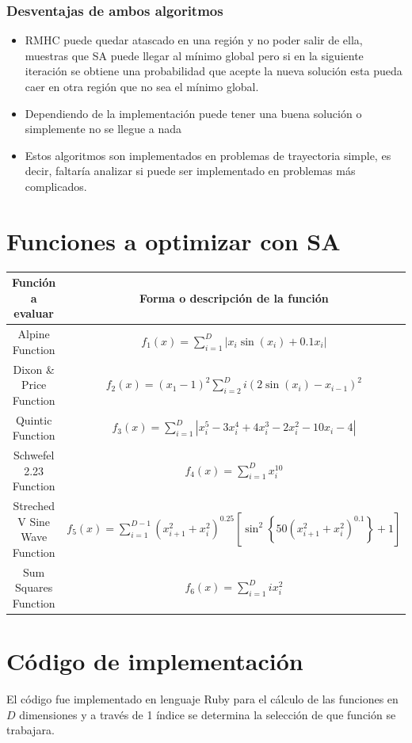 \documentclass[10pt]{article}
\begin{document}
\subsubsection{Desventajas de ambos algoritmos}
\begin{itemize}
  \item RMHC puede quedar atascado en una región y no poder salir de ella, muestras que SA puede llegar al mínimo global pero si en la siguiente iteración se obtiene una probabilidad que acepte la nueva solución esta pueda caer en otra región que no sea el mínimo global.
  \item Dependiendo de la implementación puede tener una buena solución o simplemente no se llegue a nada
  \item Estos algoritmos son implementados en problemas de trayectoria simple, es decir, faltaría analizar si puede ser implementado en problemas más complicados.
\end{itemize}

\section{Funciones a optimizar con SA}
\begin{center}
  \begin{tabular}{|c|c|}
    \hline
    Función a evaluar & Forma o descripción de la función\\
    \hline
    Alpine Function & \(\displaystyle f_{1}(x)=\sum_{i=1}^{D} \left|x_{i}\sin(x_{i})+0.1x_{i}\right|\) \\
    \hline
    Dixon \& Price Function & \(\displaystyle f_{2}(x)=(x_{1}-1)^{2}\sum_{i=2}^{D} i\left(2\sin(x_{i})-x_{i-1}\right)^{2}\)\\
    \hline
    Quintic Function & \(\displaystyle f_{3}(x)=\sum_{i=1}^{D} \left|x_{i}^{5}-3x_{i}^{4}+4x_{i}^3-2x_{i}^{2}-10x_{i}-4\right|\)\\
    \hline
    Schwefel 2.23 Function & \(\displaystyle f_{4}(x)=\sum_{i=1}^{D}x_{i}^{10}\)\\
    \hline
    Streched V Sine Wave Function & \(\displaystyle f_{5}(x)=\sum_{i=1}^{D-1}(x_{i+1}^{2}+x_{i}^{2})^{0.25}\left[\sin^{2}\left\{50(x_{i+1}^{2}+x_{i}^{2})^{0.1}\right\}+1\right]\)\\
    \hline
    Sum Squares Function & \(\displaystyle f_{6}(x)=\sum_{i=1}^{D}ix_{i}^{2}\)\\
    \hline
  \end{tabular}
\end{center}
\section{Código de implementación}
El código fue implementado en lenguaje Ruby para el cálculo de las funciones en $D$ dimensiones y a través de 1 índice se determina la selección de que función se trabajara.
\end{document}
